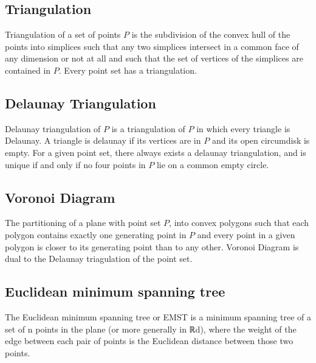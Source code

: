 \documentclass[preprint,5p,times,twocolumn]{elsarticle}
\begin{document}
\subsection{Triangulation}
Triangulation of a set of points $P$ is the subdivision of the convex hull of the points into simplices such that any two simplices intersect in a common face of any dimension or not at all and such that the set of vertices of the simplices are contained in $P$. Every point set has a triangulation. 

\subsection{Delaunay Triangulation}
Delaunay triangulation of $P$ is a triangulation of $P$ in which every triangle is Delaunay. A triangle is delaunay if its vertices are in $P$ and its open circumdisk is empty. For a given point set, there always exists a delaunay triangulation, and is unique if and only if no four points in $P$ lie on a common empty circle.

\subsection{Voronoi Diagram}
The partitioning of a plane with point set $P$, into convex polygons such that each polygon contains exactly one generating point in $P$ and every point in a given polygon is closer to its generating point than to any other. Voronoi Diagram is dual to the Delaunay triagulation of the point set.

%

\subsection{Euclidean minimum spanning tree}
The Euclidean minimum spanning tree or EMST is a minimum spanning tree of a set of n points in the plane (or more generally in ℝd), where the weight of the edge between each pair of points is the Euclidean distance between those two points.
\end{document}
